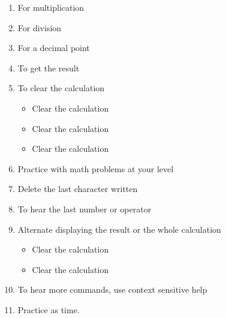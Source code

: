 \documentclass[10pt,letterpaper,twoside]{report}
\begin{document}
\begin{enumerate}
\begin{enumerate}
		      \item For multiplication 
		      \item For division 
		      \item For a decimal point 
		      \item To get the result 
		      \item To clear the calculation
		            \begin{itemize}
			            \item Clear the calculation 
			            \item  Clear the calculation
			            \item Clear the calculation
		            \end{itemize}
		      \item Practice with math problems at your level
		      \item Delete the last character written 
		      \item To hear the last number or operator 
		      \item Alternate displaying the result or the whole calculation
		            \begin{itemize}
			            \item Clear the calculation 
			            \item Clear the calculation 
		            \end{itemize}
		      \item To hear more commands, use context sensitive help 
		      \item Practice as time.
	      \end{enumerate}
\end{enumerate}
\end{document}
